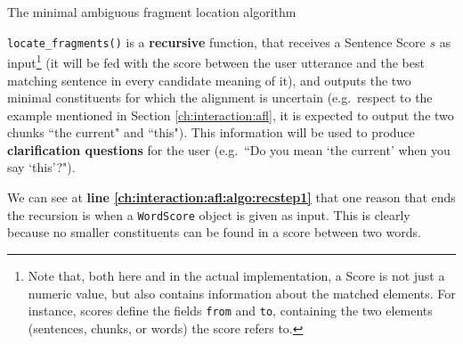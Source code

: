 \begin{algorithm}

  
\caption{The minimal ambiguous fragment location algorithm\label{ch:interaction:afl:algo}}
\end{algorithm}

\texttt{locate\_fragments()} is a \textbf{recursive} function, that receives a Sentence Score $s$ as input\footnote{Note that, both here and in the actual implementation, a Score is not just a numeric value, but also contains information about the matched elements. For instance, scores define the fields \texttt{from} and \texttt{to}, containing the two elements (sentences, chunks, or words) the score refers to.} (it will be fed with the score between the user utterance and the best matching sentence in every candidate meaning of it), and outputs the two minimal constituents for which the alignment is uncertain (e.g.\ respect to the example mentioned in Section \ref{ch:interaction:afl}, it is expected to output the two chunks ``the current" and ``this"). This information will be used to produce \textbf{clarification questions} for the user (e.g.\ ``Do you mean `the current' when you say `this'?").

We can see at \textbf{line \ref{ch:interaction:afl:algo:recstep1}} that one reason that ends the recursion is when a \texttt{WordScore} object is given as input. This is clearly because no smaller constituents can be found in a score between two words.

